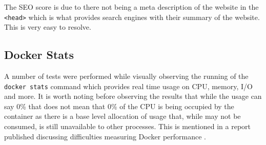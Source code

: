The SEO score is due to there not being a meta description of the website in the \texttt{<head>} which is what provides search engines with their summary of the website. This is very easy to resolve. 

\subsection{Docker Stats} \label{test:perf-docker}

A number of tests were performed while visually observing the running of the \texttt{docker stats} command which provides real time usage on CPU, memory, I/O and more. It is worth noting before observing the results that while the usage can say 0\% that does not mean that 0\% of the CPU is being occupied by the container as there is a base level allocation of usage that, while may not be consumed, is still unavailable to other processes. This is mentioned in a report published discussing difficulties measuring Docker performance \cite{docker-perf}.

